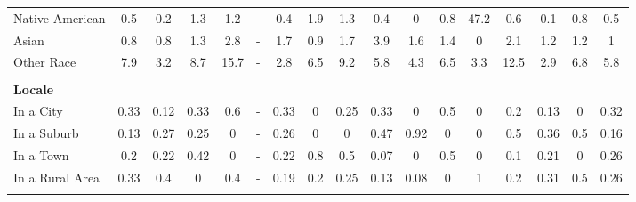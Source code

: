 \begin{tabular*}{\linewidth}{@{\extracolsep{\fill} } lcccccccccccccccc}
\hspace{0.2cm}Native American&0.5&0.2&1.3&1.2&{-}&0.4&1.9&1.3&0.4&0&0.8&47.2&0.6&0.1&0.8&0.5\\%
\hspace{0.2cm}Asian&0.8&0.8&1.3&2.8&{-}&1.7&0.9&1.7&3.9&1.6&1.4&0&2.1&1.2&1.2&1\\%
\hspace{0.2cm}Other Race&7.9&3.2&8.7&15.7&{-}&2.8&6.5&9.2&5.8&4.3&6.5&3.3&12.5&2.9&6.8&5.8\\%
&&&&&&&&&&&&&&&&\\%
\multicolumn{17}{l}{\bfseries Locale}\\%
\hspace{0.2cm}In a City&0.33&0.12&0.33&0.6&{-}&0.33&0&0.25&0.33&0&0.5&0&0.2&0.13&0&0.32\\%
\hspace{0.2cm}In a Suburb&0.13&0.27&0.25&0&{-}&0.26&0&0&0.47&0.92&0&0&0.5&0.36&0.5&0.16\\%
\hspace{0.2cm}In a Town&0.2&0.22&0.42&0&{-}&0.22&0.8&0.5&0.07&0&0.5&0&0.1&0.21&0&0.26\\%
\hspace{0.2cm}In a Rural Area&0.33&0.4&0&0.4&{-}&0.19&0.2&0.25&0.13&0.08&0&1&0.2&0.31&0.5&0.26\\%
&&&&&&&&&&&&&&&&\\%
\hline%
\end{tabular*}